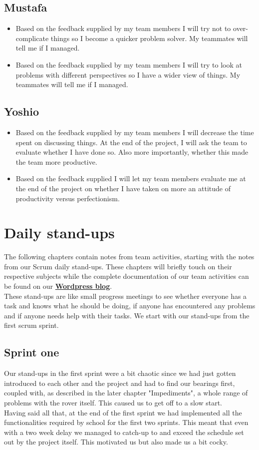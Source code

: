 \documentclass[12pt]{article}
\begin{document}
	\subsection{Mustafa}
	\begin{itemize}
		\item Based on the feedback supplied by my team members I will try not to over-complicate things so I become a quicker problem solver. My teammates will tell me if I managed.
		\item Based on the feedback supplied by my team members I will try to look at problems with different perspectives so I have a wider view of things. My teammates will tell me if I managed.
	\end{itemize}
	\subsection{Yoshio}
	\begin{itemize}
		\item Based on the feedback supplied by my team members I will decrease the time spent on discussing things. At the end of the project, I will ask the team to evaluate whether I have done so. Also more importantly, whether this made the team more productive.
		\item Based on the feedback supplied I will let my team members evaluate me at the end of the project on whether I have taken on more an attitude of productivity versus perfectionism.
	\end{itemize}
	\newpage
	\section{Daily stand-ups}
	The following chapters contain notes from team activities, starting with the notes from our Scrum daily stand-ups. These chapters will briefly touch on their respective subjects while the complete documentation of our team activities can be found on our \href{https://metabotsrow.wordpress.com/}{\textbf{Wordpress blog}}.\\
	These stand-ups are like small progress meetings to see whether everyone has a task and knows what he should be doing, if anyone has encountered any problems and if anyone needs help with their tasks. We start with our stand-ups from the first scrum sprint.
	\subsection{Sprint one}
	Our stand-ups in the first sprint were a bit chaotic since we had just gotten introduced to each other and the project and had to find our bearings first, coupled with, as described in the later chapter "Impediments", a whole range of problems with the rover itself. This caused us to get off to a slow start.\\
	Having said all that, at the end of the first sprint we had implemented all the functionalities required by school for the first two sprints. This meant that even with a two week delay we managed to catch-up to and exceed the schedule set out by the project itself. This motivated us but also made us a bit cocky.
\end{document}
